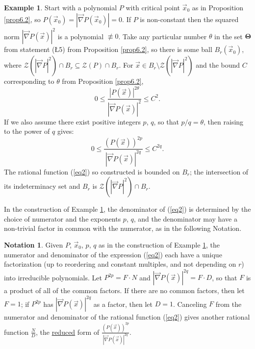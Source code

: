\documentclass[12pt]{amsart}
\theoremstyle{definition}
\newtheorem{notation}[thm]{Notation}
\newtheorem{example}[thm]{Example}
\theoremstyle{remark}
\numberwithin{equation}{section}
\newcommand{\vv}{\mathcal{Z}}
\begin{document}
\begin{example}\label{ex3.2}
  Start with a polynomial $P$ with critical point $\vec x_0$ as in Proposition \ref{prop6.2}, so $P(\vec x_0)=|\vec\nabla P(\vec x_0)|=0$.  If $P$ is non-constant then the squared norm $|\vec\nabla P(\vec x)|^2$ is a polynomial $\not\equiv0$.  Take any particular number $\theta$ in the set $\mathbf\Theta$ from statement (\L5) from Proposition \ref{prop6.2}, so there is some ball $B_r(\vec x_0)$, where $\vv(|\vec\nabla P|^2)\cap B_r\subseteq\vv(P)\cap B_r$.  For $\vec x\in B_r\setminus\vv(|\vec\nabla P|^2)$ and the bound $C$ corresponding to $\theta$ from Proposition \ref{prop6.2},%
\begin{equation*}%
  0\le\frac{|P(\vec x)|^{2\theta}}{\left|\vec\nabla P(\vec x)\right|^2}\le C^2.
\end{equation*}
If we also assume there exist positive integers $p$, $q$, so that $p/q=\theta$, then raising to the power of $q$ gives:
\begin{equation}\label{eq2}
  0\le\frac{(P(\vec x))^{2p}}{\left|\vec\nabla P(\vec x)\right|^{2q}}\le C^{2q}.
\end{equation}
The rational function (\ref{eq2}) so constructed is bounded on $B_r$; the intersection of its indeterminacy set and $B_r$ is $\vv(|\vec\nabla P|^2)\cap B_r$.  
\end{example}
In the construction of Example \ref{ex3.2}, the denominator of (\ref{eq2}) is determined by the choice of numerator and the exponents $p$, $q$, and the denominator may have a non-trivial factor in common with the numerator, as in the following Notation.
\begin{notation}\label{not4.5}
  Given $P$, $\vec x_0$, $p$, $q$ as in the construction of Example \ref{ex3.2}, the numerator and denominator of the expression (\ref{eq2}) each have a unique factorization (up to reordering and constant multiples, and not depending on $r$) into irreducible polynomials.  Let $P^{2p}=F\cdot N$ and $\left|\vec\nabla P(\vec x)\right|^{2q}=F\cdot D$, so that $F$ is a product of all of the common factors.  If there are no common factors, then let $F=1$; if   $P^{2p}$ has $\left|\vec\nabla P(\vec x)\right|^{2q}$ as a factor, then let $D=1$.  Canceling $F$ from the numerator and denominator of the rational function (\ref{eq2}) gives  another rational function $\displaystyle{\frac ND}$, the {\underline{reduced}} form of $\displaystyle{\frac{(P(\vec x))^{2p}}{\left|\vec\nabla P(\vec x)\right|^{2q}}}$. 
\end{notation}
\end{document}
